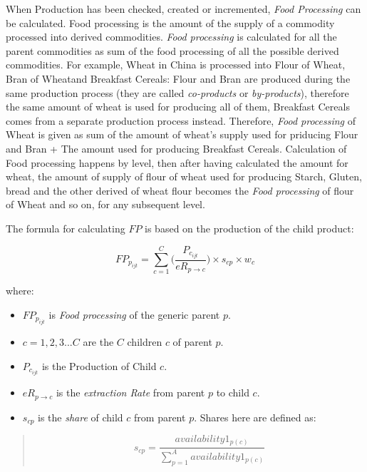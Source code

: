 \documentclass[]{article}
\providecommand{\tightlist}{%
  \setlength{\itemsep}{0pt}\setlength{\parskip}{0pt}}
\begin{document}
When Production has been checked, created or incremented, \emph{Food
Processing} can be calculated. Food processing is the amount of the
supply of a commodity processed into derived commodities. \emph{Food
processing} is calculated for all the parent commodities as sum of the
food processing of all the possible derived commodities. For example,
Wheat in China is processed into Flour of Wheat, Bran of Wheatand
Breakfast Cereals: Flour and Bran are produced during the same
production process (they are called \emph{co-products} or
\emph{by-products}), therefore the same amount of wheat is used for
producing all of them, Breakfast Cereals comes from a separate
production process instead. Therefore, \emph{Food processing} of Wheat
is given as sum of the amount of wheat's supply used for priducing Flour
and Bran + The amount used for producing Breakfast Cereals. Calculation
of Food processing happens by level, then after having calculated the
amount for wheat, the amount of supply of flour of wheat used for
producing Starch, Gluten, bread and the other derived of wheat flour
becomes the \emph{Food processing} of flour of Wheat and so on, for any
subsequent level.

The formula for calculating \(FP\) is based on the production of the
child product:

\begin{equation}
\label{eq:Food Processing}
FP_{p_{ijt}} = \sum \limits_{c=1}^C\biggl(\frac{P_{c_{ijt}}}{eR_{p\to c}}\biggr)\times s_{cp}\times w_{c}
\end{equation}

where:

\begin{itemize}
\tightlist
\item
  \(FP_{p_{ijt}}\) is \emph{Food processing} of the generic parent
  \(p\).
\item
  \(c = 1,2,3...C\) are the \(C\) children \(c\) of parent \(p\).
\item
  \(P_{c_{ijt}}\) is the Production of Child \(c\).
\item
  \(eR_{p\to c}\) is the \emph{extraction Rate} from parent \(p\) to
  child \(c\).
\item
  \(s_{cp}\) is the \emph{share} of child \(c\) from parent \(p\).
  Shares here are defined as:
\end{itemize}

\begin{quote}
\begin{equation}
\label{eq:shares}
s_{cp} = \frac{availability1_{p(c)}}{\sum \limits_{p=1}^A{availability1_{p(c)}}}
\end{equation}
\end{quote}
\end{document}
